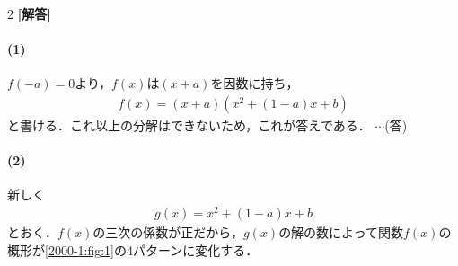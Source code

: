 \documentclass[../../main.tex]{subfiles}
\begin{document}
\setcounter{equation}{0}
\setcounter{figure}{0}
\setcounter{table}{0}
\begin{oframed}
  
\end{oframed}
\setlength{\columnseprule}{0.4pt}
\begin{multicols}{2}
  {\bf [解答]}

  \paragraph{(1)}
  $f(-a)=0$より，$f(x)$は$(x+a)$を因数に持ち，
  \begin{align}
    f(x)=(x+a)(x^2+(1-a)x+b)
  \end{align}
  と書ける．これ以上の分解はできないため，これが答えである．  $\cdots$(答)

  \paragraph{(2)}
  新しく
  \begin{align}
    g(x) = x^2+(1-a)x+b
  \end{align}
  とおく．$f(x)$の三次の係数が正だから，$g(x)$の解の数によって関数$f(x)$の概形が\cref{2000-1:fig:1}の4パターンに変化する．


\end{multicols}
\end{document}
